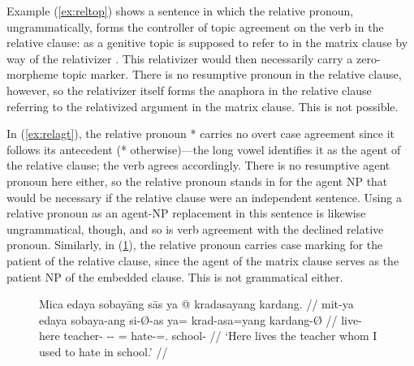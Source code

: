 Example (\ref{ex:reltop}) shows a sentence in which the relative pronoun, 
ungrammatically, forms the controller of topic agreement on the verb in the 
relative clause:  as a genitive topic is supposed to refer to 
 in the matrix clause by way of the
relativizer . This relativizer would then necessarily carry a
zero-morpheme topic marker. There is no resumptive pronoun in the relative
clause, however, so the relativizer itself forms the anaphora in the relative
clause referring to the relativized argument in the matrix clause. This is not
possible.

In (\ref{ex:relagt}), the relative pronoun * carries no
overt case agreement since it follows its antecedent (*
otherwise)---the long vowel identifies it as the agent of the relative clause;
the verb agrees accordingly. There is no resumptive agent pronoun here either,
so the relative pronoun stands in for the agent NP that would be necessary if
the relative clause were an independent sentence. Using a relative pronoun as
an agent-NP replacement in this sentence is likewise ungrammatical, though, and
so is verb agreement with the declined relative pronoun. Similarly, in
(\ref{ex:relpat}), the relative pronoun carries case marking for the patient of
the relative clause, since the agent of the matrix clause serves as the patient
NP of the embedded clause. This is not grammatical either.

\begin{figure}
\ex\label{ex:relpat}
\ljudge* \begingl
	\gla Mica edaya sobayāng sās ya @ kradasayang kardang. //
	\glb mit-ya edaya sobaya-ang si-Ø-as ya= krad-asa=yang kardang-Ø //
	\glc live-\TsgM{} here teacher-\Aarg{} \Rel{}-\Aarg{}-\Parg{} \LocT{}=
		hate-\Hab{}=\Fsg{}.\Aarg{} school-\Top{} //
% 
	\glft `Here lives the teacher whom I used to hate in school.' //
\endgl
\xe
\end{figure}

